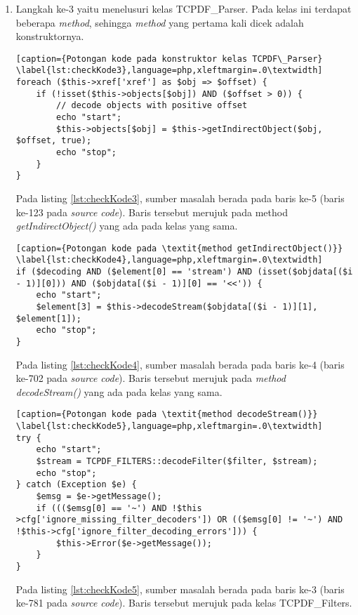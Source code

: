 \begin{enumerate}
	\item Langkah ke-3 yaitu menelusuri kelas TCPDF\_Parser. Pada kelas ini terdapat beberapa \textit{method}, sehingga \textit{method} yang pertama kali dicek adalah konstruktornya.
	
\begin{lstlisting}[caption={Potongan kode pada konstruktor kelas TCPDF\_Parser}	\label{lst:checkKode3},language=php,xleftmargin=.0\textwidth]
foreach ($this->xref['xref'] as $obj => $offset) {
	if (!isset($this->objects[$obj]) AND ($offset > 0)) {
		// decode objects with positive offset
		echo "start";
		$this->objects[$obj] = $this->getIndirectObject($obj, $offset, true);
		echo "stop";
	}
}
\end{lstlisting}

	Pada listing \ref{lst:checkKode3}, sumber masalah berada pada baris ke-5 (baris ke-123 pada \textit{source code}). Baris tersebut merujuk pada method \textit{getIndirectObject()} yang ada pada kelas yang sama.
	
\begin{lstlisting}[caption={Potongan kode pada \textit{method getIndirectObject()}}	\label{lst:checkKode4},language=php,xleftmargin=.0\textwidth]
if ($decoding AND ($element[0] == 'stream') AND (isset($objdata[($i - 1)][0])) AND ($objdata[($i - 1)][0] == '<<')) {
	echo "start";	
	$element[3] = $this->decodeStream($objdata[($i - 1)][1], $element[1]);
	echo "stop";
}
\end{lstlisting}

	Pada listing \ref{lst:checkKode4}, sumber masalah berada pada baris ke-4 (baris ke-702 pada \textit{source code}). Baris tersebut merujuk pada \textit{method decodeStream()} yang ada pada kelas yang sama.
	
\begin{lstlisting}[caption={Potongan kode pada \textit{method decodeStream()}}	\label{lst:checkKode5},language=php,xleftmargin=.0\textwidth]
try {
	echo "start";
	$stream = TCPDF_FILTERS::decodeFilter($filter, $stream);
	echo "stop";
} catch (Exception $e) {
	$emsg = $e->getMessage();
	if ((($emsg[0] == '~') AND !$this >cfg['ignore_missing_filter_decoders']) OR (($emsg[0] != '~') AND !$this->cfg['ignore_filter_decoding_errors'])) {
		$this->Error($e->getMessage());
	}
}
\end{lstlisting}
	
	Pada listing \ref{lst:checkKode5}, sumber masalah berada pada baris ke-3 (baris ke-781 pada \textit{source code}). Baris tersebut merujuk pada kelas TCPDF\_Filters.
	

\end{enumerate}
